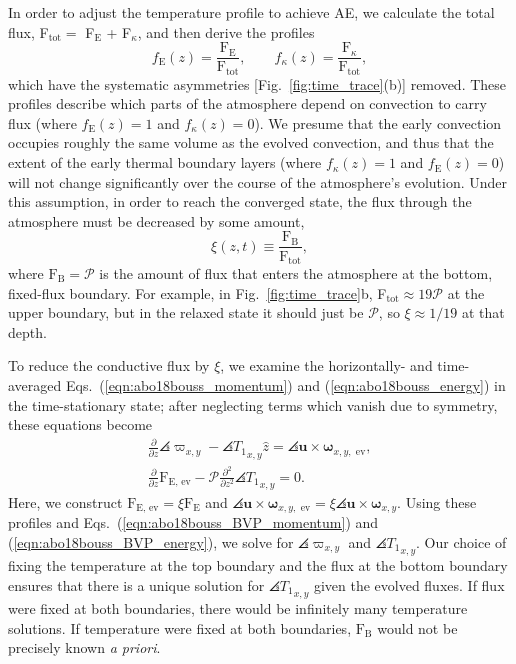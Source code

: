 In order to adjust the temperature profile to achieve AE, we calculate the total flux, F$_{\text{tot}} =$ F$_{\text{E}}$ + F$_{\kappa}$, and then derive the profiles
\begin{equation}
f_{\text{E}}(z) = \frac{\text{F}_{\text{E}}}{\text{F}_{\text{tot}}},\qquad
f_{\kappa}(z) = \frac{\text{F}_{\kappa}}{\text{F}_{\text{tot}}},
\label{eqn:abo18bvp_ratios}
\end{equation}
which have the systematic asymmetries [Fig.~\ref{fig:time_trace}(b)] removed. 
These profiles describe which parts of the atmosphere depend on convection to carry flux (where $f_{\text{E}}(z) = 1$ and $f_{\kappa}(z) = 0$).
We presume that the early convection occupies roughly the same volume as the evolved convection, and thus that the extent of the early thermal boundary layers (where $f_{\kappa}(z) = 1$ and $f_{\text{E}}(z) = 0$) will not change significantly over the course of the atmosphere's evolution.
Under this assumption, in order to reach the converged state, the flux through the atmosphere must be decreased by some amount, 
\begin{equation}
\xi(z,t) \equiv \frac{\text{F}_{\text{B}}}{\text{F}_{\text{tot}}},
\label{eqn:abo18xi}
\end{equation}
where $\text{F}_{\text{B}} = \mathcal{P}$ is the amount of flux that enters the atmosphere at the bottom, fixed-flux boundary.
For example, in Fig.~\ref{fig:time_trace}b, F$_{\text{tot}} \approx 19\mathcal{P}$ at the upper boundary, but in the relaxed state it should just be $\mathcal{P}$, so $\xi \approx 1/19$ at that depth.

To reduce the conductive flux by $\xi$, we examine the horizontally- and time-averaged Eqs.~(\ref{eqn:abo18bouss_momentum}) and (\ref{eqn:abo18bouss_energy}) in the time-stationary state; after neglecting terms which vanish due to symmetry, these equations become
\vspace{-0.2cm}
\begin{gather}
\frac{\partial}{\partial z}\angles{\varpi}_{x,y} - \angles{T_1}_{x,y}\hat{z} = \angles{\bm{u}\times\bm{\omega}}_{x,y, \text{ ev}},
	\label{eqn:abo18bouss_BVP_momentum}
\\
\frac{\partial}{\partial z}\text{F}_{\text{E, ev}} - \mathcal{P}\frac{\partial^2}{\partial z^2} \angles{T_1}_{x,y} = 0.
	\label{eqn:abo18bouss_BVP_energy}
\end{gather}
Here, we construct  $\text{F}_{\text{E, ev}} = \xi \text{F}_{\text{E}}$ and $\angles{\bm{u}\times\bm{\omega}}_{x, y,\text{ ev}} = \xi\angles{\bm{u}\times\bm{\omega}}_{x, y}$.
Using these profiles and Eqs.~(\ref{eqn:abo18bouss_BVP_momentum}) and (\ref{eqn:abo18bouss_BVP_energy}), we solve for $\angles{\varpi}_{x,y}$ and $\angles{T_1}_{x,y}$.
Our choice of fixing the temperature at the top boundary and the flux at the bottom boundary ensures that there is a unique solution for $\angles{T_1}_{x,y}$ given the evolved fluxes. 
If flux were fixed at both boundaries, there would be infinitely many temperature solutions. 
If temperature were fixed at both boundaries, $\text{F}_{\text{B}}$ would not be precisely known \emph{a priori}.

